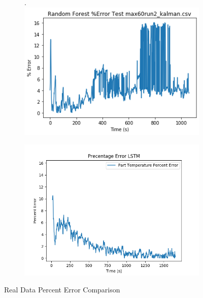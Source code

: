 \begin{figure}[ht]
    \begin{subfigure}{.5\linewidth}.
        \centering
    	\includegraphics[width=\linewidth]{other/RF_error_real2.png}
    \end{subfigure}
    \begin{subfigure}{.5\linewidth}
    	\centering
    	\includegraphics[width=1.01\linewidth]{lstm/run2_rescale.png}
    	\vspace{.05pt}
    \end{subfigure}
    \caption{Real Data Percent Error Comparison}
    \label{fig:real_data_error_rs_lstm1}
\end{figure}

